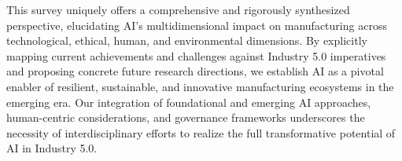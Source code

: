 \documentclass[sigconf]{acmart}
\begin{document}
This survey uniquely offers a comprehensive and rigorously synthesized perspective, elucidating AI’s multidimensional impact on manufacturing across technological, ethical, human, and environmental dimensions. By explicitly mapping current achievements and challenges against Industry 5.0 imperatives and proposing concrete future research directions, we establish AI as a pivotal enabler of resilient, sustainable, and innovative manufacturing ecosystems in the emerging era. Our integration of foundational and emerging AI approaches, human-centric considerations, and governance frameworks underscores the necessity of interdisciplinary efforts to realize the full transformative potential of AI in Industry 5.0.






\end{document}
